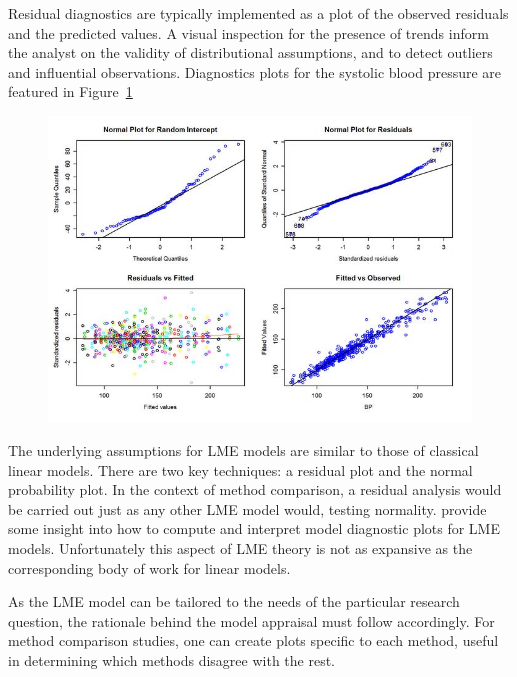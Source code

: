 \documentclass[12pt, a4paper]{report}
\theoremstyle{definition}
\theoremstyle{remark}
\begin{document}
Residual diagnostics are typically implemented as a plot of the observed residuals and the predicted values. A visual inspection for the presence of trends inform the analyst on the validity of distributional assumptions, and to detect outliers and influential observations. Diagnostics plots for the systolic blood pressure are featured in Figure~\ref{fig:ResidPlot}

\begin{figure}[h!]
	\centering
	\includegraphics[width=0.9\linewidth]{images/ResidPlot}
	\caption{}
	\label{fig:ResidPlot}
\end{figure}
The underlying assumptions for LME models are similar to those of classical linear models. There are two key techniques: a residual plot and the normal probability plot. In the context of method comparison, a residual analysis would be carried out just as any other LME model would, testing normality. \citet{PB} provide some insight into how to compute and interpret model diagnostic plots for LME models. Unfortunately this aspect of LME theory is not as expansive as the corresponding body of work for linear models.

As the LME model can be tailored to the needs of the particular research question, the rationale behind the model appraisal must follow accordingly. 
For method comparison studies, one can create plots specific to each method, useful in determining which methods disagree with the rest.
\end{document}
